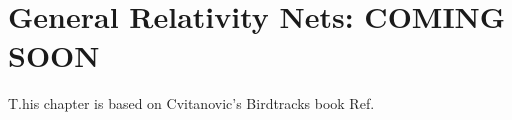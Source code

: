 \chapter{General Relativity Nets: COMING SOON}
\label{gen-rel/gen-rel}

T.his chapter is based on Cvitanovic's Birdtracks book Ref. \cite{birdtracks-book}